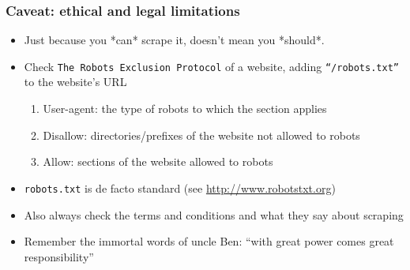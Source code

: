 \begin{frame}
\frametitle{Caveat: ethical and legal limitations}

\begin{itemize}
\item Just because you *can* scrape it, doesn't mean you *should*. 
\medskip
\item Check \texttt{The Robots Exclusion Protocol} of a website, adding \texttt{``/robots.txt''} to the website's URL
\begin{enumerate}
  \item User-agent:  the type of robots to which the section applies
  \item Disallow:  directories/prefixes of the website not allowed to robots
  \item Allow:  sections of the website allowed to robots
\end{enumerate}
\medskip
\item \texttt{robots.txt} is de facto standard (see \url{http://www.robotstxt.org})
\medskip
\item Also always check the terms and conditions and what they say about scraping
\medskip
\item Remember the immortal words of uncle Ben: ``with great power comes great responsibility''

\end{itemize}


\end{frame}